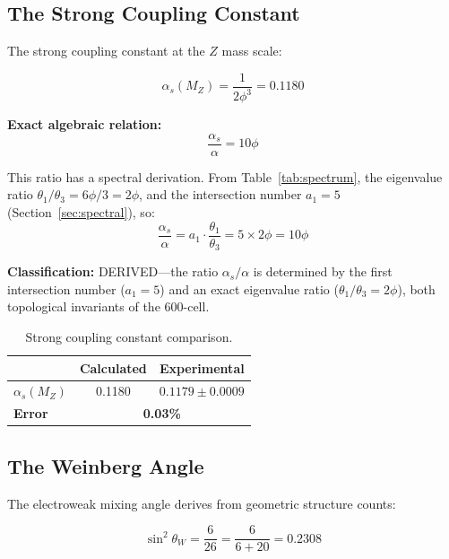 \documentclass[12pt,a4paper]{article}
\begin{document}
\subsection{The Strong Coupling Constant}\label{sec:alpha_s}

The strong coupling constant at the $Z$ mass scale:

\begin{equation}
\alpha_s(M_Z) = \frac{1}{2\phi^3} = 0.1180
\end{equation}

\textbf{Exact algebraic relation:}
\begin{equation}
\boxed{\frac{\alpha_s}{\alpha} = 10\phi}
\end{equation}

This ratio has a spectral derivation. From Table~\ref{tab:spectrum}, the eigenvalue ratio $\theta_1/\theta_3 = 6\phi/3 = 2\phi$, and the intersection number $a_1 = 5$ (Section~\ref{sec:spectral}), so:
\begin{equation}
\frac{\alpha_s}{\alpha} = a_1 \cdot \frac{\theta_1}{\theta_3} = 5 \times 2\phi = 10\phi
\end{equation}

\textbf{Classification:} DERIVED---the ratio $\alpha_s/\alpha$ is determined by the first intersection number ($a_1 = 5$) and an exact eigenvalue ratio ($\theta_1/\theta_3 = 2\phi$), both topological invariants of the 600-cell.

\begin{table}[H]
\centering
\begin{tabular}{lcc}
\toprule
& \textbf{Calculated} & \textbf{Experimental} \\
\midrule
$\alpha_s(M_Z)$ & 0.1180 & $0.1179 \pm 0.0009$ \\
\textbf{Error} & \multicolumn{2}{c}{\textbf{0.03\%}} \\
\bottomrule
\end{tabular}
\caption{Strong coupling constant comparison.}
\end{table}

\subsection{The Weinberg Angle}

The electroweak mixing angle derives from geometric structure counts:

\begin{equation}
\sin^2\theta_W = \frac{6}{26} = \frac{6}{6+20} = 0.2308
\end{equation}
\end{document}
